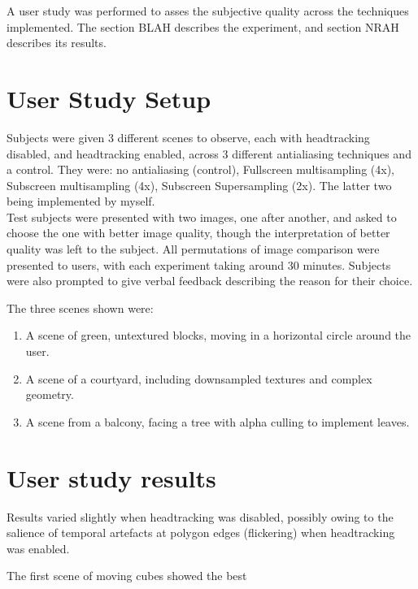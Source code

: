 \documentclass[12pt,a4paper,twoside,openright]{report}
\begin{document}
A user study was performed to asses the subjective quality across the techniques implemented. The section BLAH describes the experiment, and section NRAH describes its results.

\section{User Study Setup}

Subjects were given 3 different scenes to observe, each with headtracking disabled, and headtracking enabled, across 3 different antialiasing techniques and a control. They were: no antialiasing (control), Fullscreen multisampling (4x),  Subscreen multisampling (4x), Subscreen Supersampling (2x). The latter two being implemented by myself.\\

Test subjects were presented with two images, one after another, and asked to choose the one with better image quality, though the interpretation of better quality was left to the subject. All permutations of image comparison were presented to users, with each experiment taking around 30 minutes. Subjects were also prompted to give verbal feedback describing the reason for their choice.

The three scenes shown were:

\begin{enumerate}
\item A scene of green, untextured blocks, moving in a horizontal circle around the user.\\

\item A scene of a courtyard, including downsampled textures and complex geometry.\\

\item A scene from a balcony, facing a tree with alpha culling to implement leaves.\\

\end{enumerate} 


\section{User study results}

Results varied slightly when headtracking was disabled, possibly owing to the salience of temporal artefacts at polygon edges (flickering) when headtracking was enabled. 

The first scene of moving cubes showed the best 
\end{document}
